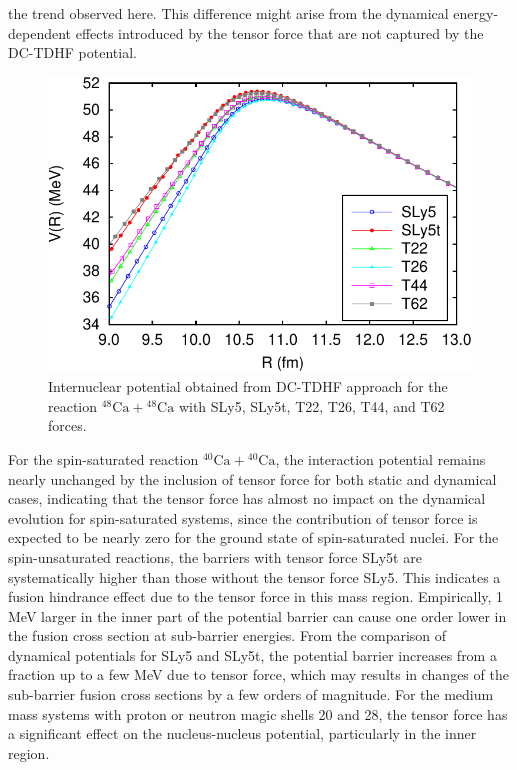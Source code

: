 the trend observed here.
This difference might arise from the dynamical energy-dependent effects introduced by the tensor force that
are not captured by the DC-TDHF potential.
\begin{figure}[t]
	\includegraphics[width=\textwidth]{../Figures/TensorPot/V5_Ca48Ca48.pdf}
	\caption{Internuclear potential obtained from DC-TDHF approach for the reaction $^{48}\mathrm{Ca}+\mathrm{^{48}Ca}$ with SLy5, SLy5t,
		T22, T26, T44, and T62 forces.
		\label{Fig:TIJ}}
\end{figure}

For the spin-saturated reaction $^{40}\mathrm{Ca}+\mathrm{^{40}Ca}$, the interaction potential remains nearly unchanged by the inclusion of tensor force
for both static and dynamical cases, indicating that the tensor force has almost no impact on the dynamical evolution for spin-saturated systems,
since the contribution of tensor force is expected to be nearly zero for the ground state of spin-saturated nuclei.
For the spin-unsaturated reactions, the barriers with tensor force SLy5t are systematically higher than those without the tensor force SLy5.
This indicates a fusion hindrance effect due to the tensor force in this mass region. Empirically, 1 MeV larger in the inner part of the potential barrier
can cause one order lower in the fusion cross section at sub-barrier energies. From the comparison of dynamical potentials for SLy5 and SLy5t,
the potential barrier increases from a fraction up to a few MeV due to tensor force, which may results in changes of the sub-barrier fusion cross sections by a few orders of magnitude. For the medium mass systems
with proton or neutron magic shells 20 and 28, the tensor force has a significant effect on the nucleus-nucleus potential, particularly in the inner region.

